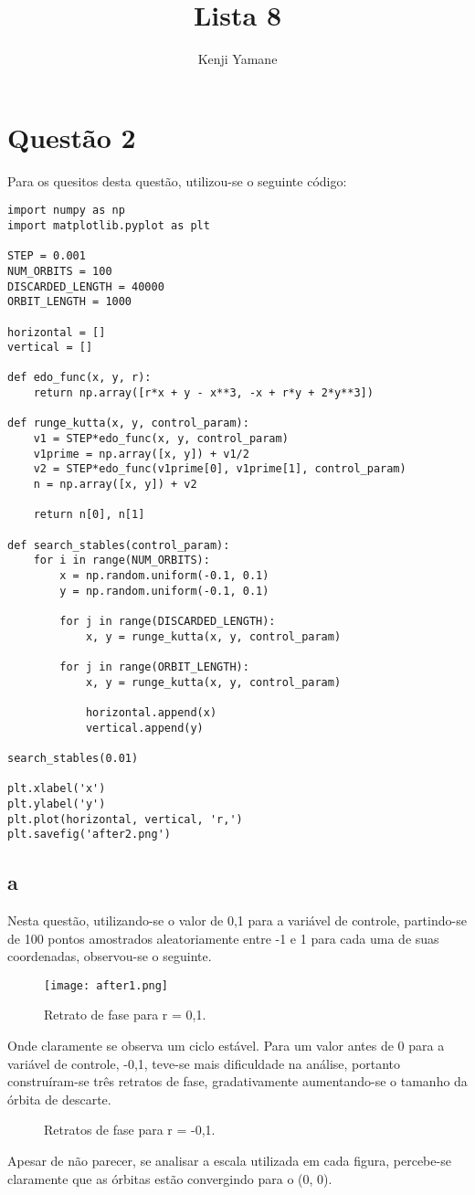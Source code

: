 \documentclass{article}[twocolumn]
\title{Lista 8}
\author{Kenji Yamane}
\begin{document}
	\maketitle
	\section{Quest\~ao 2}
	Para os quesitos desta quest\~ao, utilizou-se o seguinte c\'odigo:
	\begin{verbatim}
import numpy as np
import matplotlib.pyplot as plt

STEP = 0.001
NUM_ORBITS = 100
DISCARDED_LENGTH = 40000
ORBIT_LENGTH = 1000

horizontal = []
vertical = []

def edo_func(x, y, r):
	return np.array([r*x + y - x**3, -x + r*y + 2*y**3])

def runge_kutta(x, y, control_param):
	v1 = STEP*edo_func(x, y, control_param)
	v1prime = np.array([x, y]) + v1/2
	v2 = STEP*edo_func(v1prime[0], v1prime[1], control_param)
	n = np.array([x, y]) + v2
	
	return n[0], n[1]

def search_stables(control_param):
	for i in range(NUM_ORBITS):
		x = np.random.uniform(-0.1, 0.1)
		y = np.random.uniform(-0.1, 0.1)
		
		for j in range(DISCARDED_LENGTH):
			x, y = runge_kutta(x, y, control_param)
		
		for j in range(ORBIT_LENGTH):
			x, y = runge_kutta(x, y, control_param)
			
			horizontal.append(x)
			vertical.append(y)

search_stables(0.01)

plt.xlabel('x')
plt.ylabel('y')
plt.plot(horizontal, vertical, 'r,')
plt.savefig('after2.png')

	\end{verbatim}
	\subsection{a}
	Nesta quest\~ao, utilizando-se o valor de 0,1 para a vari\'avel de controle,
	partindo-se de 100 pontos amostrados aleatoriamente entre -1 e 1 para cada uma
	de suas coordenadas, observou-se o seguinte.
	\begin{figure}[H]
		\centering
		\texttt{[image: after1.png]}
		\caption{Retrato de fase para r = 0,1.}
	\end{figure}
	Onde claramente se observa um ciclo est\'avel.
	Para um valor antes de 0 para a vari\'avel de controle, -0,1, teve-se mais
	dificuldade na an\'alise, portanto constru\'iram-se tr\^es retratos de fase,
	gradativamente aumentando-se o tamanho da \'orbita de descarte.
	\begin{figure}[H]
		\centering
		\caption{Retratos de fase para r = -0,1.}
	\end{figure}
	Apesar de n\~ao parecer, se analisar a escala utilizada em cada figura, percebe-se
	claramente que as \'orbitas est\~ao convergindo para o (0, 0).
\end{document}
